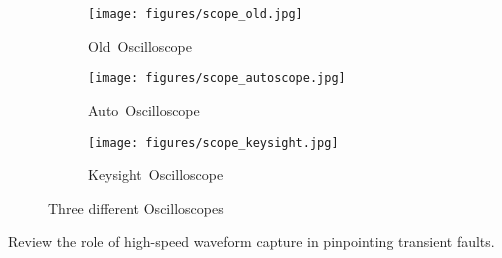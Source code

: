 \begin{figure}[ht]
  \centering

  \begin{subfigure}[b]{0.3\linewidth}
    \centering
    \texttt{[image: figures/scope\_old.jpg]}
    \caption{\mbox{Old Oscilloscope}}
  \end{subfigure}
  \hfill
  \begin{subfigure}[b]{0.3\linewidth}
    \centering
    \texttt{[image: figures/scope\_autoscope.jpg]}
    \caption{\mbox{Auto Oscilloscope}}
  \end{subfigure}
  \hfill
  \begin{subfigure}[b]{0.3\linewidth}
    \centering
    \texttt{[image: figures/scope\_keysight.jpg]}
    \caption{\mbox{Keysight Oscilloscope}}
  \end{subfigure}

  \caption{Three different Oscilloscopes}
  \label{fig:scopes}
\end{figure}
Review the role of high-speed waveform capture in pinpointing transient faults.

